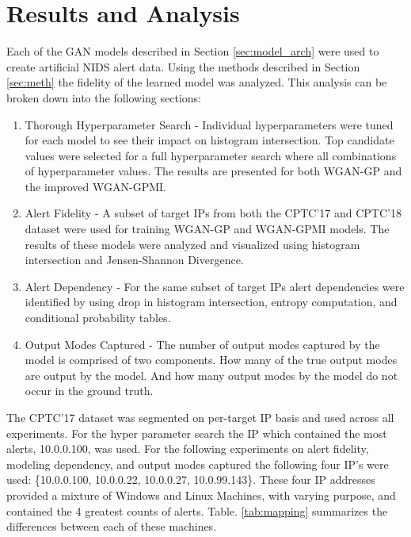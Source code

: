 \chapter{Results and Analysis}
\label{sec:rna}


Each of the GAN models described in Section \ref{sec:model_arch} were used to create artificial NIDS alert data.  Using the methods described in Section \ref{sec:meth} the fidelity of the learned model was analyzed. This analysis can be broken down into the following sections:

\begin{enumerate}
	\item Thorough Hyperparameter Search - Individual hyperparameters were tuned for each model to see their impact on histogram intersection. Top candidate values were selected for a full hyperparameter search where all combinations of hyperparameter values. The results are presented for both WGAN-GP and the improved WGAN-GPMI.

	\item Alert Fidelity - A subset of target IPs from both the CPTC'17 and CPTC'18 dataset were used for training WGAN-GP and WGAN-GPMI models. The results of these models were analyzed and visualized using histogram intersection and Jensen-Shannon Divergence.

	\item Alert Dependency - For the same subset of target IPs alert dependencies were identified by using drop in histogram intersection, entropy computation, and conditional probability tables.

	\item Output Modes Captured - The number of output modes captured by the model is comprised of two components. How many of the true output modes are output by the model. And how many output modes by the model do not occur in the ground truth.

\end{enumerate}

The CPTC'17 dataset was segmented on per-target IP basis and used across all experiments. For the hyper parameter search the IP which contained the most alerts, 10.0.0.100, was used. For the following experiments on alert fidelity, modeling dependency, and output modes captured the following four IP's were used: \{10.0.0.100, 10.0.0.22, 10.0.0.27, 10.0.99.143\}. These four IP addresses provided a mixture of Windows and Linux Machines, with varying purpose, and contained the 4 greatest counts of alerts. Table. \ref{tab:mapping} summarizes the differences between each of these machines.

